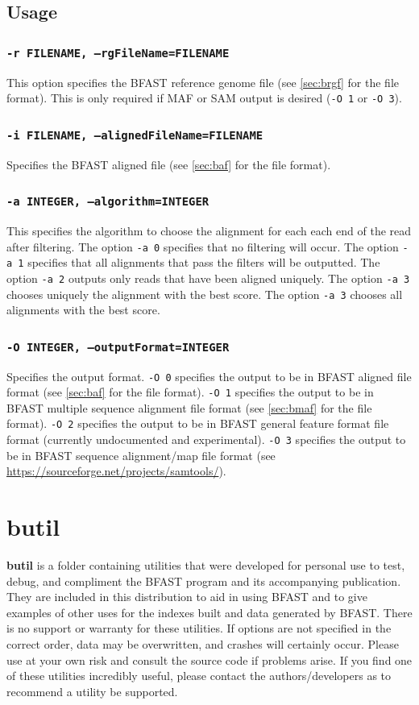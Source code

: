 \documentclass[a4paper,12pt]{book}
\newcommand{\TT}[1]{{\tt #1}} %
\newcommand{\BF}[1]{{\bf #1}} %
\newcommand{\BRGF}{BFAST reference genome file} %
\newcommand{\BAF}{BFAST aligned file} %
\newcommand{\BMAF}{BFAST multiple sequence alignment file} %
\newcommand{\BGFFF}{BFAST general feature format file} %
\newcommand{\BSAMF}{BFAST sequence alignment/map file} %
\begin{document}
\subsection{Usage}

\subsubsection{\TT{-r FILENAME, --rgFileName=FILENAME}}
This option specifies the \BRGF{} (see \autoref{sec:brgf} for the file format).
This is only required if MAF or SAM output is desired (\TT{-O 1} or \TT{-O 3}).

\subsubsection{\TT{-i FILENAME, --alignedFileName=FILENAME}}
Specifies the \BAF{} (see \autoref{sec:baf} for the file format).

\subsubsection{\TT{-a INTEGER, --algorithm=INTEGER}}
This specifies the algorithm to choose the alignment for each each end of the read after filtering.
The option \TT{-a 0} specifies that no filtering will occur.
The option \TT{-a 1} specifies that all alignments that pass the filters will be outputted.
The option \TT{-a 2} outputs only reads that have been aligned uniquely.
The option \TT{-a 3} chooses uniquely the alignment with the best score.
The option \TT{-a 3} chooses all alignments with the best score.

\subsubsection{\TT{-O INTEGER, --outputFormat=INTEGER}}
Specifies the output format.
\TT{-O 0} specifies the output to be in \BAF{} format (see \autoref{sec:baf} for the file format).
\TT{-O 1} specifies the output to be in \BMAF{} format (see \autoref{sec:bmaf} for the file format).
\TT{-O 2} specifies the output to be in \BGFFF{} format (currently undocumented and experimental).
\TT{-O 3} specifies the output to be in \BSAMF{} format (see \url{https://sourceforge.net/projects/samtools/}).

\section{butil}
\label{sec:butil}
\BF{butil} is a folder containing utilities that were developed for personal use to test, debug, and compliment the BFAST program and its accompanying publication.  
They are included in this distribution to aid in using BFAST and to give examples of other uses for the indexes built and data generated by BFAST.
There is no support or warranty for these utilities.  
If options are not specified in the correct order, data may be overwritten, and crashes will certainly occur.  
Please use at your own risk and consult the source code if problems arise.  
If you find one of these utilities incredibly useful, please contact the authors/developers as to recommend a utility be supported.
\end{document}
